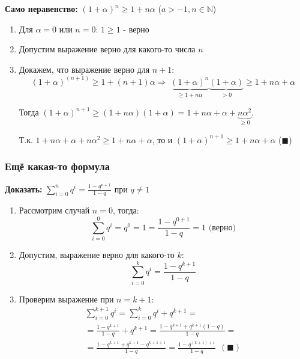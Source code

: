 \documentclass[class=article,a4paper,12pt,crop=false]{standalone}
\begin{document}
\textbf{Само неравенство:} $(1 + \alpha)^n \geq 1 + n\alpha$ ($a > -1, n \in \mathbb{N}$)

\begin{enumerate}
  \item {
    Для $\alpha = 0$ или $n = 0$: $1 \geq 1$ - верно
  }
  \item {
    Допустим выражение верно для какого-то числа $n$
  }
  \item {
    Докажем, что выражение верно для $n + 1$:
    \begin{equation}
        (1 + \alpha)^{(n + 1)} \geq 1 + (n + 1)\alpha%
        \Rightarrow \;
        \underbrace{(1 + \alpha)^n}_{\geq 1 + n\alpha}\underbrace{(1 + \alpha)}_{> 0} \geq 1 + n\alpha + \alpha %
    \end{equation}

    Тогда $(1 + \alpha)^{n + 1} \geq (1 + n\alpha)(1 + \alpha) =
    1 + n\alpha + \alpha + \underbrace{n\alpha^2}_{\geq 0}$.

    Т.к. $1 + n\alpha + \alpha + n\alpha^2 \geq 1 + n\alpha + \alpha$, то
    и $(1 + \alpha)^{n + 1} \geq 1 + n\alpha + \alpha$ ($\blacksquare$)
  }
\end{enumerate}

\subsubsection{Ещё какая-то формула}

\textbf{Доказать:} $\sum\limits_{i = 0}^n{q^i} = \frac{1 - q^{n + 1}}{1 - q}$ при $q \neq 1$

\begin{enumerate}
  \item {
    Рассмотрим случай $n = 0$, тогда:
    \begin{equation}
      \sum\limits_{i = 0}^0{q^i} = q^0 = 1 = \frac{1 - q^{0 + 1}}{1 - q} = 1 \text{ (верно)}
    \end{equation}
  }
  \item {
    Допустим, выражение верно для какого-то $k$:
    \begin{equation}
      \sum\limits_{i = 0}^k{q^i} = \frac{1 - q^{k + 1}}{1 - q}
    \end{equation}
  }
  \item {
    Проверим выражение при $n = k + 1$:
    \begin{multline}
      \sum\limits_{i = 0}^{k + 1}{q^i} = \sum\limits_{i = 0}^{k}{q^i} + q^{k + 1} = \\ =
      \frac{1 - q^{k + 1}}{1 - q} + q^{k + 1} 
      = \frac{1 - q^{k + 1} + q^{k + 1}(1 - q)}{1 - q} = \\ =
      \frac{1 - q^{k + 1} +q^{k + 1} - q^{k + 1  + 1}}{1 - q} 
      = \frac{1 - q^{(k + 1) + 1}}{1 - q} \:\: (\blacksquare)
    \end{multline}
  }
\end{enumerate}
\end{document}
